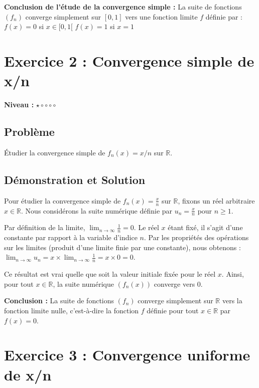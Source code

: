 \documentclass{report}
\begin{document}
\textbf{Conclusion de l'étude de la convergence simple :}
La suite de fonctions $(f_n)$ converge simplement sur $[0,1]$ vers une fonction limite $f$ définie par :
$f(x) = 0$ si $x \in [0, 1[$
$f(x) = 1$ si $x = 1$

\newpage


\chapter*{Exercice 2 : Convergence simple de x/n}

\textbf{Niveau :} $\star \circ \circ \circ \circ $

\section*{Problème}

Étudier la convergence simple de $f_n(x) = x/n$ sur $\mathbb{R}$.

\section*{Démonstration et Solution}

Pour étudier la convergence simple de $f_n(x) = \frac{x}{n}$ sur $\mathbb{R}$, fixons un réel arbitraire $x \in \mathbb{R}$.
Nous considérons la suite numérique définie par $u_n = \frac{x}{n}$ pour $n \geq 1$.

Par définition de la limite, $\lim_{n \to \infty} \frac{1}{n} = 0$.
Le réel $x$ étant fixé, il s'agit d'une constante par rapport à la variable d'indice $n$. Par les propriétés des opérations sur les limites (produit d'une limite finie par une constante), nous obtenons :
$\lim_{n \to \infty} u_n = x \times \lim_{n \to \infty} \frac{1}{n} = x \times 0 = 0$.

Ce résultat est vrai quelle que soit la valeur initiale fixée pour le réel $x$.
Ainsi, pour tout $x \in \mathbb{R}$, la suite numérique $(f_n(x))$ converge vers 0.

\textbf{Conclusion :}
La suite de fonctions $(f_n)$ converge simplement sur $\mathbb{R}$ vers la fonction limite nulle, c'est-à-dire la fonction $f$ définie pour tout $x \in \mathbb{R}$ par $f(x) = 0$.

\newpage


\chapter*{Exercice 3 : Convergence uniforme de x/n}
\end{document}
